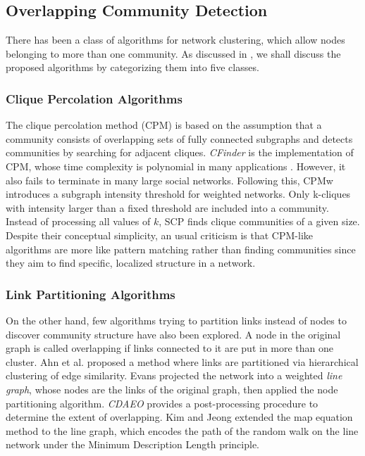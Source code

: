 \subsection{Overlapping Community Detection}
There has been a class of algorithms for network clustering, which allow nodes belonging to more than one community. As discussed in
\cite{Xie_2013s}, we shall discuss the proposed algorithms by categorizing them into five classes.

\subsubsection*{Clique Percolation Algorithms}
The clique percolation method (CPM) is based on the assumption that a community consists of overlapping sets of fully connected subgraphs
and detects communities by searching for adjacent cliques. {\em CFinder} is the implementation of CPM, whose time complexity is polynomial
in many applications \cite{Palla05}. However, it also fails to terminate in many large social networks. Following this, CPMw
\cite{Farkas180} introduces a subgraph intensity threshold for weighted networks. Only k-cliques with intensity larger than a fixed
threshold are included
into a community. Instead of processing all values of $k$, SCP \cite{Kumpula08} finds clique communities of a given size. Despite their
conceptual simplicity, an usual criticism is that CPM-like algorithms are more like pattern matching rather than
finding communities since
they aim to find specific, localized structure in a network.

\subsubsection*{Link Partitioning Algorithms}
On the other hand, few algorithms trying to  partition links instead of nodes to discover community structure have also been explored. A
node in the original graph is called overlapping if links connected to it are put in more than one cluster. Ahn et al. \cite{nature2010}
proposed a method where links are partitioned via hierarchical clustering of edge similarity.  Evans \cite{Evans0638} projected
the network into a weighted {\em line graph}, whose nodes are the links of the original graph, then applied the node partitioning
algorithm. {\em CDAEO} \cite{5680851} provides a post-processing procedure to determine the extent of overlapping. Kim and Jeong
\cite{Kim0257} extended the map equation method \cite{Rosvall290} to the line graph, which encodes the path
of the random walk on the line network under the Minimum Description Length principle. 


